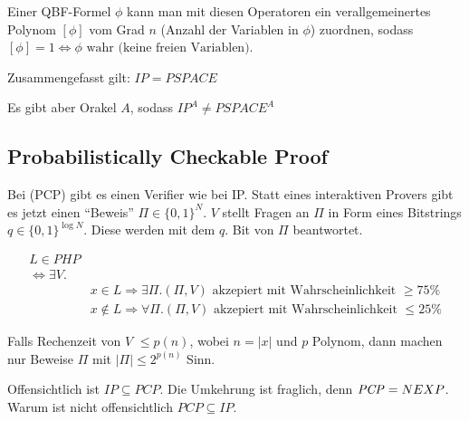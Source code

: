 Einer QBF-Formel $\phi$ kann man mit diesen Operatoren ein verallgemeinertes
Polynom $[\phi]$ vom Grad $n$ (Anzahl der Variablen in $\phi$) zuordnen, sodass
$[\phi] = 1 \Leftrightarrow \phi \text{ wahr (keine freien Variablen)}$.




\begin{satz}

Zusammengefasst gilt:
$\mathit{IP} = \mathit{PSPACE}$

Es gibt aber Orakel $A$, sodass
$\mathit{IP}^A \neq \mathit{PSPACE}^A$

\end{satz}








\subsection{Probabilistically Checkable Proof}
\label{sec:probabilistically_checkable_proof}


\begin{definition}
    Bei  (PCP) gibt es einen
    Verifier wie bei IP.
    Statt eines interaktiven Provers gibt es jetzt einen ``Beweis'' $\Pi \in
    \{0,1\}^N$.
    $V$ stellt Fragen an $\Pi$ in Form eines Bitstrings $q \in \{0,1\}^{\log
    N}$.
    Diese werden mit dem $q.$ Bit von $\Pi$ beantwortet.

    \begin{align*}
        L \in \mathit{PHP} &\\
        \Leftrightarrow \exists V . & \\
                                    & x \in L \Rightarrow \exists \Pi . (\Pi, V) \text{ akzepiert mit
    Wahrscheinlichkeit } \geq 75\% \\
                                    & x \notin L \Rightarrow \forall \Pi . (\Pi, V) \text{ akzepiert mit
    Wahrscheinlichkeit } \leq 25\%
    \end{align*}

\end{definition}

Falls Rechenzeit von $V$ $\leq p(n)$, wobei $n = |x|$ und $p$ Polynom,
dann machen nur Beweise $\Pi$ mit $|\Pi| \leq 2^{p(n)}$ Sinn.

Offensichtlich ist $\mathit{IP} \subseteq \mathit{PCP}$.
Die Umkehrung ist fraglich, denn $\mathit{PCP} = NEXP$. Warum
ist nicht offensichtlich $\mathit{PCP} \subseteq \mathit{IP}$.

